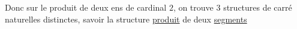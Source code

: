 
Donc sur le produit de deux ens de cardinal $2$, on trouve $3$ structures de carré naturelles distinctes,  savoir la structure \uline{produit} de deux \uline{segments}

